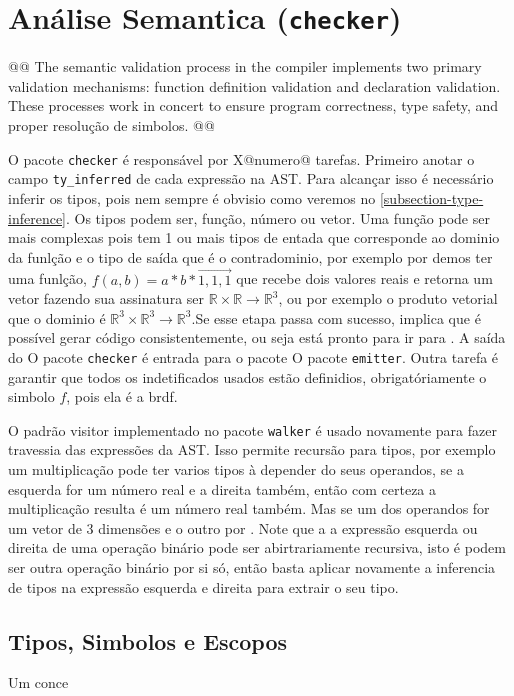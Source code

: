 
\section{Análise Semantica (\texttt{checker})}

@@ 
The semantic validation process in the compiler implements two primary validation mechanisms: function definition validation and declaration validation. These processes work in concert to ensure program correctness, type safety, and proper resolução de simbolos.
@@

O pacote \texttt{checker} é responsável por X@numero@ tarefas. Primeiro anotar o campo \verb"ty_inferred" de cada expressão na AST. Para alcançar isso é necessário inferir os tipos, pois nem sempre é obvisio como veremos no \autoref{subsection-type-inference}. Os tipos podem ser, função, número ou vetor. Uma função pode ser mais complexas pois tem 1 ou mais tipos de entada que corresponde ao dominio da funlção e  o tipo de saída que é o contradominio, por exemplo por demos ter uma funlção, $f(a,b) = a*b*\vec{1,1,1}$ que recebe dois valores reais e retorna um vetor fazendo sua assinatura ser $\mathbb{R}\times\mathbb{R} \to \mathbb{R}^3$, ou por exemplo o produto vetorial que o dominio é $\mathbb{R}^3\times\mathbb{R}^3 \to \mathbb{R}^3$.Se esse etapa passa com sucesso, implica que é possível gerar código consistentemente, ou seja está pronto para ir para . A saída do O pacote \texttt{checker} é entrada para o pacote O pacote \texttt{emitter}. Outra tarefa é garantir que todos os indetificados usados estão definidios, obrigatóriamente o simbolo $f$, pois ela é a brdf.

O padrão visitor implementado no pacote \texttt{walker} é usado novamente para fazer travessia das expressões da AST. Isso permite recursão para tipos, por exemplo um multiplicação pode ter varios tipos à depender do seus operandos, se a esquerda for um número real e a direita também, então com certeza a multiplicação resulta é um número real também. Mas se um dos operandos for um vetor de 3 dimensões e o outro por . Note que a a expressão esquerda ou direita de uma operação binário pode ser abirtrariamente recursiva, isto é podem ser outra operação binário por si só, então basta aplicar novamente a inferencia de tipos na expressão esquerda e direita para extrair o seu tipo.


\subsection{Tipos, Simbolos e Escopos}
Um conce


